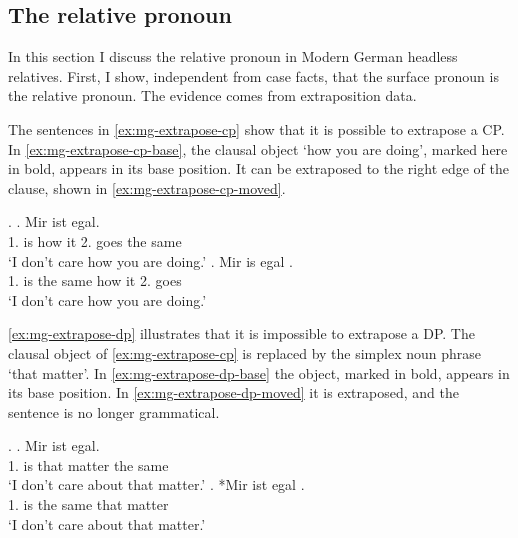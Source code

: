 \subsection{The relative pronoun}\label{sec:mg-rel}

In this section I discuss the relative pronoun in Modern German headless relatives.
First, I show, independent from case facts, that the surface pronoun is the relative pronoun. The evidence comes from extraposition data.

The sentences in \ref{ex:mg-extrapose-cp} show that it is possible to extrapose a CP. In \ref{ex:mg-extrapose-cp-base}, the clausal object  `how you are doing', marked here in bold, appears in its base position. It can be extraposed to the right edge of the clause, shown in \ref{ex:mg-extrapose-cp-moved}.

\ex.\label{ex:mg-extrapose-cp}
\ag. Mir ist     egal.\\
1. is how it 2. goes {the same}\\
`I don't care how you are doing.'\label{ex:mg-extrapose-cp-base}
\bg. Mir is egal    .\\
1. is {the same} how it 2. goes\\
`I don't care how you are doing.' \label{ex:mg-extrapose-cp-moved}

\ref{ex:mg-extrapose-dp} illustrates that it is impossible to extrapose a DP. The clausal object of \ref{ex:mg-extrapose-cp} is replaced by the simplex noun phrase  `that matter'.
In \ref{ex:mg-extrapose-dp-base} the object, marked in bold, appears in its base position. In \ref{ex:mg-extrapose-dp-moved} it is extraposed, and the sentence is no longer grammatical.

\ex.\label{ex:mg-extrapose-dp}
\ag. Mir ist   egal.\\
1. is that matter {the same}\\
`I don't care about that matter.'\label{ex:mg-extrapose-dp-base}
\bg. *Mir ist egal  .\\
1. is {the same} that matter\\
`I don't care about that matter.' \label{ex:mg-extrapose-dp-moved}


